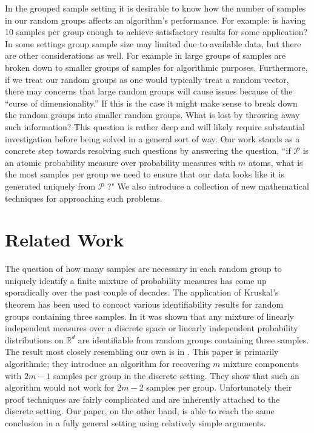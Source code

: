 \documentclass{article} %
\def\rn{\mathbb{R}}
\def\sP{\mathscr{P}}
\theoremstyle{definition}
\begin{document}
In the grouped sample setting it is desirable to know how the number of samples in our random groups affects an algorithm's performance. For example: is having 10 samples per group enough to achieve satisfactory results for some application? In some settings group sample size may limited due to available data, but there are other considerations as well. For example in \cite{anandkumar14} large groups of samples are broken down to smaller groups of samples for algorithmic purposes. Furthermore, if we treat our random groups as one would typically treat a random vector, there may concerns that large random groups will cause issues because of the ``curse of dimensionality.'' If this is the case it might make sense to break down the random groups into smaller random groups. What is lost by throwing away such information? This question is rather deep and will likely require substantial investigation before being solved in a general sort of way. Our work stands as a concrete step towards resolving such questions by answering the question, ``if $\sP$ is an atomic probability measure over probability measures with $m$ atoms, what is the most samples per group we need to ensure that our data looks like it is generated uniquely from $\sP$ ?" We also introduce a collection of new mathematical techniques for approaching such problems.

\section{Related Work}
The question of how many samples are necessary in each random group to uniquely identify a finite mixture of probability measures has come up sporadically over the past couple of decades. The application of Kruskal's theorem \cite{kruskal77} has been used to concoct various identifiability results for random groups containing three samples. In \cite{allman09} it was shown that any mixture of linearly independent measures over a discrete space or linearly independent probability distributions on $\rn^d$ are identifiable from random groups containing three samples. The result most closely resembling our own is in \cite{rabani13}. This paper is primarily algorithmic; they introduce an algorithm for recovering $m$ mixture components with $2m-1$ samples per group in the discrete setting. They show that such an algorithm would not work for $2m-2$ samples per group. Unfortunately their proof techniques are fairly complicated and are inherently attached to the discrete setting. Our paper, on the other hand, is able to reach the same conclusion in a fully general setting using relatively simple arguments.
\end{document}

